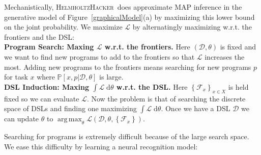 \documentclass{article}
\newcommand{\system}{\textsc{HelmholtzHacker}~}
\newcommand{\lowerBound}{\mathscr{L}}
\DeclareMathOperator*{\argmax}{arg\,max} %
\newcommand{\probability}{\mathds{P}} %
\begin{document}


Mechanistically, \system does approximate MAP inference in the generative model of Figure~\ref{graphicalModel}(a) by maximizing this lower bound on the joint probability.
We maximize $\lowerBound$ by alternatingly maximizing w.r.t. the frontiers and the DSL:
\\\noindent \textbf{Program Search: Maxing $\lowerBound$ w.r.t. the frontiers.} Here $(\mathcal{D},\theta)$ is fixed and we
want to find new programs to add to  the frontiers so that $\lowerBound$ increases the most.
Adding new programs to the frontiers means searching for new programs $p$ for task $x$
where $\probability[x,p|\mathcal{D},\theta]$ is large.
\\\noindent \textbf{DSL Induction: Maxing $\int \lowerBound\;\mathrm{d}\theta$ w.r.t. the DSL.} Here $\left\{\mathcal{F}_x \right\}_{x\in X}$ is held fixed so we can evaluate $\lowerBound$. Now the problem is that of searching the discrete space of DSLs and finding one maximizing $\int \lowerBound\;\mathrm{d}\theta$.
Once we have a DSL $\mathcal{D}$ we can update $\theta$ to $\argmax_\theta \lowerBound(\mathcal{D},\theta,\left\{\mathcal{F}_x \right\})$. 


Searching for programs is extremely difficult because
of the large search space. We ease this difficulty by learning a neural recognition model:
\end{document}
